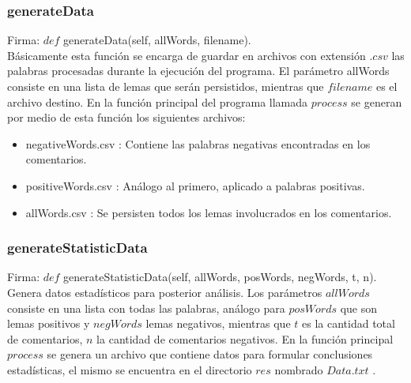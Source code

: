 \documentclass[12pt]{article}
\begin{document}
\subsubsection{generateData}
Firma: $def$ generateData(self, allWords, filename). \\
Básicamente esta función se encarga de guardar en archivos con extensión $.csv$ las palabras procesadas durante la ejecución del programa. El parámetro allWords consiste en una lista de lemas que serán persistidos, mientras que $filename$ es el archivo destino. En la función principal del programa llamada $process$ se generan por medio de esta función los siguientes archivos:
\begin{itemize}
  \item negativeWords.csv : Contiene las palabras negativas encontradas en los comentarios.
  \item positiveWords.csv : Análogo al primero, aplicado a palabras positivas.
  \item allWords.csv : Se persisten todos los lemas involucrados en los comentarios. 
\end{itemize}


\subsubsection{generateStatisticData}
Firma: $def$ generateStatisticData(self, allWords, posWords, negWords, t, n). \\
Genera datos estadísticos para posterior análisis. Los parámetros $allWords$ consiste en una lista con todas las palabras, análogo para $posWords$ que son lemas positivos y $negWords$ lemas negativos, mientras que $t$ es la cantidad total de comentarios, $n$ la cantidad de comentarios negativos.
En la función principal $process$ se genera un archivo que contiene datos para formular conclusiones estadísticas, el mismo se encuentra en el directorio $res$ nombrado $Data.txt$ .
\end{document}
